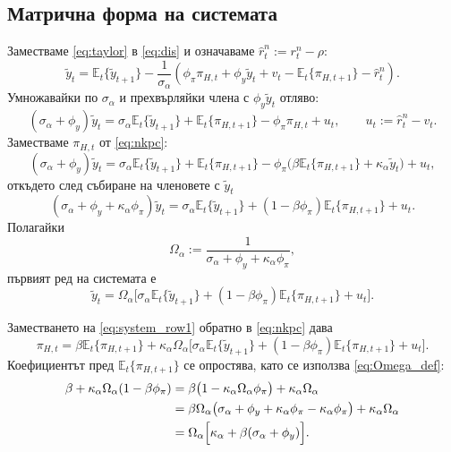\subsection{Матрична форма на системата}

Заместваме \eqref{eq:taylor} в \eqref{eq:dis} и означаваме $\hat{r}^n_t := r^n_t - \rho$:
\[
\tilde{y}_t = \mathbb{E}_t\{\tilde{y}_{t+1}\}
- \frac{1}{\sigma_\alpha}\left( \phi_\pi \pi_{H,t} + \phi_y \tilde{y}_t + v_t - \mathbb{E}_t\{\pi_{H,t+1}\} - \hat{r}^n_t \right).
\]
Умножавайки по $\sigma_\alpha$ и прехвърляйки члена с $\phi_y \tilde{y}_t$ отляво:
\begin{equation}
(\sigma_\alpha + \phi_y)\tilde{y}_t = \sigma_\alpha \mathbb{E}_t\{\tilde{y}_{t+1}\}
+ \mathbb{E}_t\{\pi_{H,t+1}\} - \phi_\pi \pi_{H,t} + u_t,
\qquad u_t := \hat{r}^n_t - v_t.
\label{eq:system_step1}
\end{equation}
Заместваме $\pi_{H,t}$ от \eqref{eq:nkpc}:
\[
(\sigma_\alpha + \phi_y)\tilde{y}_t = \sigma_\alpha \mathbb{E}_t\{\tilde{y}_{t+1}\}
+ \mathbb{E}_t\{\pi_{H,t+1}\} - \phi_\pi \big( \beta\mathbb{E}_t\{\pi_{H,t+1}\} + \kappa_\alpha \tilde{y}_t \big) + u_t,
\]
откъдето след събиране на членовете с $\tilde{y}_t$
\begin{equation}
(\sigma_\alpha + \phi_y + \kappa_\alpha \phi_\pi)\tilde{y}_t
= \sigma_\alpha \mathbb{E}_t\{\tilde{y}_{t+1}\} + (1 - \beta\phi_\pi)\mathbb{E}_t\{\pi_{H,t+1}\} + u_t.
\label{eq:system_row1_raw}
\end{equation}
Полагайки
\begin{equation}
\Omega_\alpha := \frac{1}{\sigma_\alpha + \phi_y + \kappa_\alpha \phi_\pi},
\label{eq:Omega_def}
\end{equation}
първият ред на системата е
\begin{equation}
\tilde{y}_t = \Omega_\alpha \Big[ \sigma_\alpha \mathbb{E}_t\{\tilde{y}_{t+1}\} + (1-\beta\phi_\pi)\mathbb{E}_t\{\pi_{H,t+1}\} + u_t \Big].
\label{eq:system_row1}
\end{equation}

Заместването на \eqref{eq:system_row1} обратно в \eqref{eq:nkpc} дава
\[
\pi_{H,t} = \beta\mathbb{E}_t\{\pi_{H,t+1}\}
+ \kappa_\alpha \Omega_\alpha \Big[ \sigma_\alpha \mathbb{E}_t\{\tilde{y}_{t+1}\} + (1-\beta\phi_\pi)\mathbb{E}_t\{\pi_{H,t+1}\} + u_t \Big].
\]
Коефициентът пред $\mathbb{E}_t\{\pi_{H,t+1}\}$ се опростява, като се използва \eqref{eq:Omega_def}:
\begin{align}
\beta + \kappa_\alpha \Omega_\alpha (1-\beta\phi_\pi)
&= \beta\big( 1 - \kappa_\alpha \Omega_\alpha \phi_\pi \big) + \kappa_\alpha \Omega_\alpha \notag \\
&= \beta \Omega_\alpha \big( \sigma_\alpha + \phi_y + \kappa_\alpha\phi_\pi - \kappa_\alpha \phi_\pi \big) + \kappa_\alpha \Omega_\alpha \notag \\
&= \Omega_\alpha \Big[ \kappa_\alpha + \beta(\sigma_\alpha + \phi_y) \Big].
\label{eq:coef_simplify}
\end{align}

